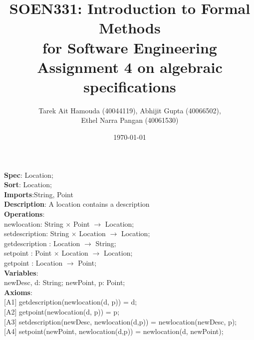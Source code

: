 \documentclass[12pt]{article}
\title{SOEN331: Introduction to Formal Methods\\for Software Engineering\\
Assignment 4 on algebraic specifications}
\author{Tarek Ait Hamouda (40044119), Abhijit Gupta (40066502), \\Ethel Narra Pangan (40061530)}
\date{\today}
\begin{document}
\begin{spacing}{1.5}

\maketitle

\noindent \textbf{Spec}: Location;\\
\noindent \textbf{Sort}: Location;\\
\noindent \textbf{Imports}:String, Point\\
\noindent \textbf{Description}: A location contains a description \\
\noindent \textbf{Operations}:\\
\hspace*{5mm} newlocation: String $\times$ Point $\rightarrow$ Location;\\
\hspace*{5mm} setdescription: String $\times$ Location $\rightarrow$ Location;\\
\hspace*{5mm} getdescription : Location $\rightarrow$ String;\\
\hspace*{5mm} setpoint : Point $\times$ Location $\rightarrow$ Location;\\
\hspace*{5mm} getpoint : Location $\rightarrow$ Point;\\
\noindent \textbf{Variables}:\\
\hspace*{5mm} newDesc, d: String; newPoint, p: Point;\\
\noindent \textbf{Axioms}:\\
\hspace*{5mm} [A1] getdescription(newlocation(d, p)) = d;\\
\hspace*{5mm} [A2] getpoint(newlocation(d, p)) = p;\\
\hspace*{5mm} [A3] setdescription(newDesc, newlocation(d,p)) = newlocation(newDesc, p);\\
\hspace*{5mm} [A4] setpoint(newPoint, newlocation(d,p)) = newlocation(d, newPoint);\\


\end{spacing}
\end{document}
